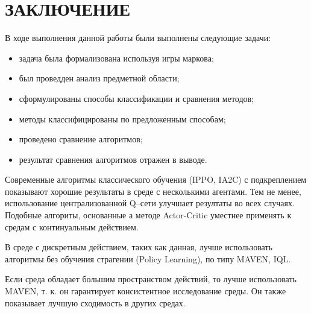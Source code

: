 \chapter*{\hfill{\centering ЗАКЛЮЧЕНИЕ }\hfill}


В ходе выполнения данной работы были выполнены следующие задачи:

\begin{itemize}[label=---]
    \item задача была формализована используя игры маркова;
    \item был проведден анализ предметной области;
    \item сформулированы способы классификации и сравнения методов;
    \item методы классифицированы по предложенным способам;
    \item проведено сравнение алгоритмов;
    \item результат сравнения алгоритмов отражен в выводе.
\end{itemize}

Современные алгоритмы классического обучения (IPPO, IA2C) с подкреплением показывают хорошие результаты в среде с несколькими агентами.
Тем не менее, использование централизованной Q--сети улучшает резултаты во всех случаях. Подобные алгориты, основанные а методе Actor-Critic 
уместнее применять к средам с континуальным действием. 

В среде с дискретным действием, таких как данная, лучше использовать алгоритмы без обучения страгении (Policy Learning), по типу MAVEN, IQL.

Если среда обладает большим пространством действий, то лучше использовать MAVEN, т. к. он гарантирует консистентное исследование среды.
Он также показывает лучшую сходимость в других средах.


